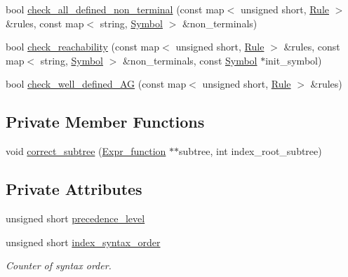 \begin{DoxyCompactItemize}
\item 
bool \hyperlink{classgenevalmag_1_1Semantics__checks_abb0a26862b6134eeb10f55b701ded180}{check\_\-all\_\-defined\_\-non\_\-terminal} (const map$<$ unsigned short, \hyperlink{classgenevalmag_1_1Rule}{Rule} $>$ \&rules, const map$<$ string, \hyperlink{classgenevalmag_1_1Symbol}{Symbol} $>$ \&non\_\-terminals)
\item 
bool \hyperlink{classgenevalmag_1_1Semantics__checks_a6d2a6d53c499f3e7abbd19ecbc0d69d5}{check\_\-reachability} (const map$<$ unsigned short, \hyperlink{classgenevalmag_1_1Rule}{Rule} $>$ \&rules, const map$<$ string, \hyperlink{classgenevalmag_1_1Symbol}{Symbol} $>$ \&non\_\-terminals, const \hyperlink{classgenevalmag_1_1Symbol}{Symbol} $\ast$init\_\-symbol)
\item 
bool \hyperlink{classgenevalmag_1_1Semantics__checks_a7234750d25c375989dfc9318e081571d}{check\_\-well\_\-defined\_\-AG} (const map$<$ unsigned short, \hyperlink{classgenevalmag_1_1Rule}{Rule} $>$ \&rules)
\end{DoxyCompactItemize}
\subsection*{Private Member Functions}
\begin{DoxyCompactItemize}
\item 
void \hyperlink{classgenevalmag_1_1Semantics__checks_ae7d4a6bbf2eebde377bc386983f61002}{correct\_\-subtree} (\hyperlink{classgenevalmag_1_1Expr__function}{Expr\_\-function} $\ast$$\ast$subtree, int index\_\-root\_\-subtree)
\end{DoxyCompactItemize}
\subsection*{Private Attributes}
\begin{DoxyCompactItemize}
\item 
unsigned short \hyperlink{classgenevalmag_1_1Semantics__checks_ae69cd5c1a7b7d2cfa05c370617a8d58f}{precedence\_\-level}
\item 
unsigned short \hyperlink{classgenevalmag_1_1Semantics__checks_a7dcdb23df315da76ae288462e3427591}{index\_\-syntax\_\-order}
\begin{DoxyCompactList}\small\item\em Counter of syntax order. \item\end{DoxyCompactList}\end{DoxyCompactItemize}


